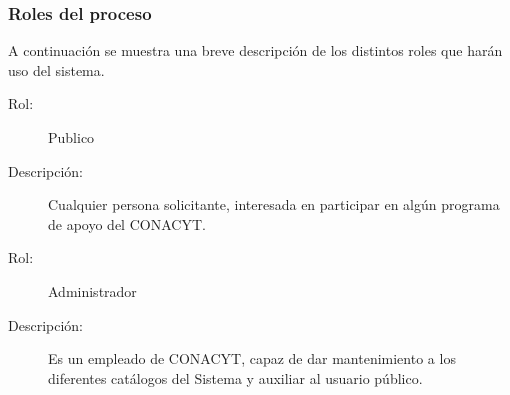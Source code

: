 


\subsubsection{Roles del proceso}

A continuación se muestra una breve descripción de los distintos roles que harán uso del sistema.



\begin{description}

	\item[Rol:] Publico
	\item[Descripción:] Cualquier persona solicitante, interesada en participar en algún programa de apoyo del CONACYT.
\end{description}

\begin{description}
	\item[Rol:] Administrador
	\item[Descripción:] Es un empleado de CONACYT, capaz de dar mantenimiento a los diferentes catálogos del Sistema y auxiliar al usuario público.
\end{description}



